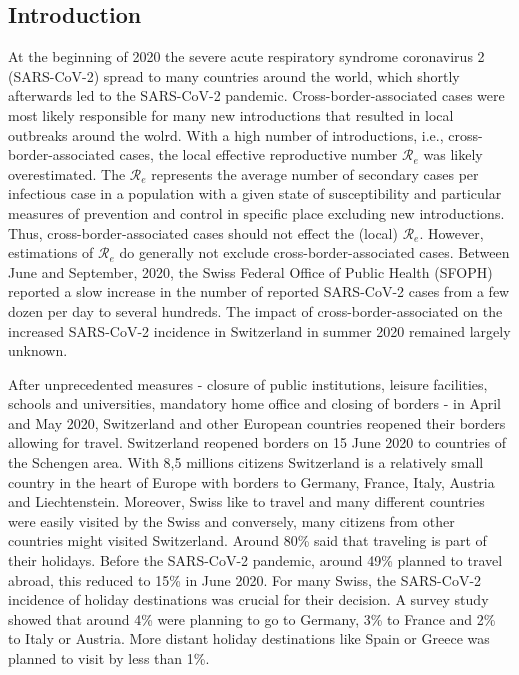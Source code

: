\documentclass[10pt, a4paper, twoside]{article}
\begin{document}
\begin{multicols}{2}
\section{Introduction}

\lhead{ }
At the beginning of 2020 the severe acute respiratory syndrome coronavirus 2 (SARS-CoV-2) spread to many countries around the world, which shortly afterwards led to the SARS-CoV-2 pandemic.\cite{worobey_emergence_2020}
Cross-border-associated cases were most likely responsible for many new introductions that resulted in local outbreaks around the wolrd.\cite{russell_effect_2021}
With a high number of introductions, i.e., cross-border-associated cases, the local effective reproductive number $\mathcal{R}_e$ was likely overestimated.\cite{roberts_early_2011}
The $\mathcal{R}_e$ represents the average number of secondary cases per infectious case in a population with a given state of susceptibility and particular measures of prevention and control in specific place excluding new introductions.
Thus, cross-border-associated cases should not effect the (local) $\mathcal{R}_e$.
However, estimations of $\mathcal{R}_e$ do generally not exclude cross-border-associated cases.
Between June and September, 2020, the Swiss Federal Office of Public Health (SFOPH) reported a slow increase in the number of reported SARS-CoV-2 cases from a few dozen per day to several hundreds.
The impact of cross-border-associated on the increased SARS-CoV-2 incidence in Switzerland in summer 2020 remained largely unknown.

After unprecedented measures - closure of public institutions, leisure facilities, schools and universities, mandatory home office and closing of borders -  in April and May 2020, Switzerland and other European countries reopened their borders allowing for travel.
Switzerland reopened borders on 15 June 2020 to countries of the Schengen area.\cite{federal_council_coronavirus_2020}
With 8,5 millions citizens Switzerland is a relatively small country in the heart of Europe with borders to Germany, France, Italy, Austria and Liechtenstein.
Moreover, Swiss like to travel and many different countries were easily visited by the Swiss and conversely, many citizens from other countries might visited Switzerland.
Around 80\% said that traveling is part of their holidays.\cite{heim_dreivon_2020}
Before the SARS-CoV-2 pandemic, around 49\% planned to travel abroad, this reduced to 15\% in June 2020.\cite{bosshardt_schweiz_2020}
For many Swiss, the SARS-CoV-2 incidence of holiday destinations was crucial for their decision.\cite{bosshardt_schweiz_2020}
A survey study showed that around 4\% were planning to go to Germany, 3\% to France and 2\% to Italy or Austria.\cite{bosshardt_schweiz_2020}
More distant holiday destinations like Spain or Greece was planned to visit by less than 1\%.\cite{bosshardt_schweiz_2020}


\end{multicols}
\end{document}
